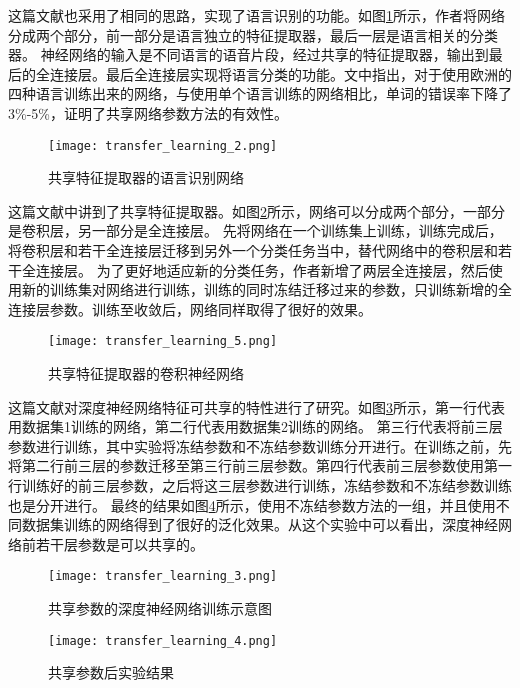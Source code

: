 这篇文献\cite{6639081}也采用了相同的思路，实现了语言识别的功能。如图\ref{fig:transfer_learning_2}所示，作者将网络分成两个部分，前一部分是语言独立的特征提取器，最后一层是语言相关的分类器。
神经网络的输入是不同语言的语音片段，经过共享的特征提取器，输出到最后的全连接层。最后全连接层实现将语言分类的功能。文中指出，对于使用欧洲的四种语言训练出来的网络，与使用单个语言训练的网络相比，单词的错误率下降了3\%-5\%，证明了共享网络参数方法的有效性。
\begin{figure}
    \centering
    \texttt{[image: transfer\_learning\_2.png]}
    \caption{共享特征提取器的语言识别网络\cite{6639081}}
    \label{fig:transfer_learning_2}
\end{figure}

这篇文献\cite{Oquab_2014_CVPR}中讲到了共享特征提取器。如图\ref{fig:transfer_learning_5}所示，网络可以分成两个部分，一部分是卷积层，另一部分是全连接层。
先将网络在一个训练集上训练，训练完成后，将卷积层和若干全连接层迁移到另外一个分类任务当中，替代网络中的卷积层和若干全连接层。
为了更好地适应新的分类任务，作者新增了两层全连接层，然后使用新的训练集对网络进行训练，训练的同时冻结迁移过来的参数，只训练新增的全连接层参数。训练至收敛后，网络同样取得了很好的效果。 
\begin{figure}
    \centering
    \texttt{[image: transfer\_learning\_5.png]}
    \caption{共享特征提取器的卷积神经网络\cite{Oquab_2014_CVPR}}
    \label{fig:transfer_learning_5}
\end{figure}

这篇文献\cite{yosinski_2014_NIPS}对深度神经网络特征可共享的特性进行了研究。如图\ref{fig:transfer_learning_3}所示，第一行代表用数据集1训练的网络，第二行代表用数据集2训练的网络。
第三行代表将前三层参数进行训练，其中实验将冻结参数和不冻结参数训练分开进行。在训练之前，先将第二行前三层的参数迁移至第三行前三层参数。第四行代表前三层参数使用第一行训练好的前三层参数，之后将这三层参数进行训练，冻结参数和不冻结参数训练也是分开进行。
最终的结果如图\ref{fig:transfer_learning_4}所示，使用不冻结参数方法的一组，并且使用不同数据集训练的网络得到了很好的泛化效果。从这个实验中可以看出，深度神经网络前若干层参数是可以共享的。
\begin{figure}
    \centering
    \texttt{[image: transfer\_learning\_3.png]}
    \caption{共享参数的深度神经网络训练示意图\cite{yosinski_2014_NIPS}}
    \label{fig:transfer_learning_3}
\end{figure}
\begin{figure}
    \centering
    \texttt{[image: transfer\_learning\_4.png]}
    \caption{共享参数后实验结果\cite{yosinski_2014_NIPS}}
    \label{fig:transfer_learning_4}
\end{figure}

